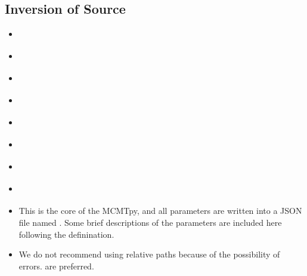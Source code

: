 \documentclass[a4paper,10pt,english,openany]{sphinxmanual}
\begin{document}
\subsection{Inversion of  Source}
\label{\detokenize{tutorials/S4_Inv_DC:inversion-of-source}}\label{\detokenize{tutorials/S4_Inv_DC::doc}}
\begin{sphinxShadowBox}
\begin{itemize}
\item {} 
\label{\detokenize{tutorials/S4_Inv_DC:id1}}{\hyperref[\detokenize{tutorials/S4_Inv_DC:path}]{}}

\item {} 
\label{\detokenize{tutorials/S4_Inv_DC:id2}}{\hyperref[\detokenize{tutorials/S4_Inv_DC:source-time-function}]{}}

\item {} 
\label{\detokenize{tutorials/S4_Inv_DC:id3}}{\hyperref[\detokenize{tutorials/S4_Inv_DC:mpi-and-chains-n}]{}}

\item {} 
\label{\detokenize{tutorials/S4_Inv_DC:id4}}{\hyperref[\detokenize{tutorials/S4_Inv_DC:misfit}]{}}

\item {} 
\label{\detokenize{tutorials/S4_Inv_DC:id5}}{\hyperref[\detokenize{tutorials/S4_Inv_DC:inversion-parameters}]{}}

\item {} 
\label{\detokenize{tutorials/S4_Inv_DC:id6}}{\hyperref[\detokenize{tutorials/S4_Inv_DC:alpha}]{}}

\item {} 
\label{\detokenize{tutorials/S4_Inv_DC:id7}}{\hyperref[\detokenize{tutorials/S4_Inv_DC:logging-file}]{}}

\item {} 
\label{\detokenize{tutorials/S4_Inv_DC:id8}}{\hyperref[\detokenize{tutorials/S4_Inv_DC:example-double-couple-inv}]{}}

\end{itemize}
\end{sphinxShadowBox}
\begin{itemize}
\item {} 
This is the core of the MCMTpy, and all parameters are written into a JSON file named .
Some brief descriptions of the parameters are included here following the definination.

\item {} 
We do not recommend using relative paths because of the possibility of errors.  are preferred.

\end{itemize}
\end{document}
